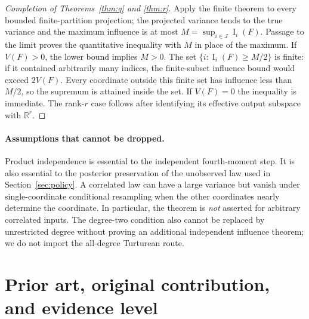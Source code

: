 \documentclass[11pt,letterpaper]{article}
\theoremstyle{definition}
\newcommand{\Inf}{\operatorname{I}}
\begin{document}
\begin{proof}[Completion of Theorems~\ref{thm:q} and \ref{thm:r}]
Apply the finite theorem to every bounded finite-partition projection;
the projected variance tends to the true variance and the maximum
influence is at most $M=\sup_{i\in J}\Inf_i(F)$. Passage to the
limit proves the quantitative inequality with $M$ in place of the
maximum. If $V(F)>0$, the lower bound implies $M>0$. The set
$\{i:\Inf_i(F)\ge M/2\}$ is finite: if it contained arbitrarily
many indices, the finite-subset influence bound would exceed $2V(F)$.
Every coordinate outside this finite set has influence less than
$M/2$, so the supremum is attained inside the set. If $V(F)=0$ the
inequality is immediate. The rank-$r$ case follows after identifying
its effective output subspace with $\mathbb R^r$.
\end{proof}
\paragraph{Assumptions that cannot be dropped.}
Product independence is essential to the independent fourth-moment
step. It is also essential to the posterior preservation of the
unobserved law used in Section~\ref{sec:policy}. A correlated law can
have a large variance but vanish under single-coordinate conditional
resampling when the other coordinates nearly determine the coordinate.
In particular, the theorem is \emph{not} asserted for arbitrary
correlated inputs. The degree-two condition also cannot be replaced
by unrestricted degree without proving an additional independent
influence theorem; we do not import the all-degree Turturean route.

\section{Prior art, original contribution, and evidence level}\label{sec:prior}
\end{document}
